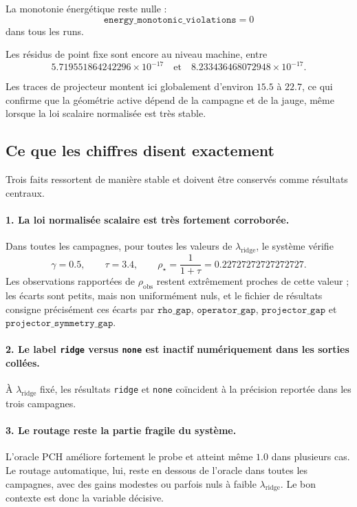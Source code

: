 La monotonie énergétique reste nulle :
\[
\texttt{energy\_monotonic\_violations}=0
\]
dans tous les runs.

Les résidus de point fixe sont encore au niveau machine, entre
\[
5.719551864242296\times 10^{-17}
\quad\text{et}\quad
8.233436468072948\times 10^{-17}.
\]

Les traces de projecteur montent ici globalement d’environ \(15.5\) à \(22.7\), ce qui confirme que la géométrie active dépend de la campagne et de la jauge, même lorsque la loi scalaire normalisée est très stable.

\subsection{Ce que les chiffres disent exactement}

Trois faits ressortent de manière stable et doivent être conservés comme résultats centraux.

\paragraph{1. La loi normalisée scalaire est très fortement corroborée.}
Dans toutes les campagnes, pour toutes les valeurs de \(\lambda_{\mathrm{ridge}}\), le système vérifie
\[
\gamma=0.5,\qquad \tau=3.4,\qquad \rho_\star=\frac{1}{1+\tau}=0.22727272727272727.
\]
Les observations rapportées de \(\rho_{\mathrm{obs}}\) restent extrêmement proches de cette valeur ; les écarts sont petits, mais non uniformément nuls, et le fichier de résultats consigne précisément ces écarts par \(\texttt{rho\_gap}\), \(\texttt{operator\_gap}\), \(\texttt{projector\_gap}\) et \(\texttt{projector\_symmetry\_gap}\).

\paragraph{2. Le label \texttt{ridge} versus \texttt{none} est inactif numériquement dans les sorties collées.}
À \(\lambda_{\mathrm{ridge}}\) fixé, les résultats \texttt{ridge} et \texttt{none} coïncident à la précision reportée dans les trois campagnes.

\paragraph{3. Le routage reste la partie fragile du système.}
L’oracle PCH améliore fortement le probe et atteint même \(1.0\) dans plusieurs cas.
Le routage automatique, lui, reste en dessous de l’oracle dans toutes les campagnes, avec des gains modestes ou parfois nuls à faible \(\lambda_{\mathrm{ridge}}\).
Le bon contexte est donc la variable décisive.

